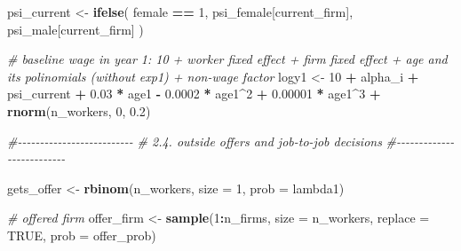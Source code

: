 \documentclass[
]{article}
\newenvironment{Shaded}{\begin{snugshade}}{\end{snugshade}}
\newcommand{\AttributeTok}[1]{\textcolor[rgb]{0.13,0.29,0.53}{#1}}
\newcommand{\CommentTok}[1]{\textcolor[rgb]{0.56,0.35,0.01}{\textit{#1}}}
\newcommand{\ConstantTok}[1]{\textcolor[rgb]{0.56,0.35,0.01}{#1}}
\newcommand{\DecValTok}[1]{\textcolor[rgb]{0.00,0.00,0.81}{#1}}
\newcommand{\FloatTok}[1]{\textcolor[rgb]{0.00,0.00,0.81}{#1}}
\newcommand{\FunctionTok}[1]{\textcolor[rgb]{0.13,0.29,0.53}{\textbf{#1}}}
\newcommand{\NormalTok}[1]{#1}
\newcommand{\OtherTok}[1]{\textcolor[rgb]{0.56,0.35,0.01}{#1}}
\newcommand{\SpecialCharTok}[1]{\textcolor[rgb]{0.81,0.36,0.00}{\textbf{#1}}}
\begin{document}
\begin{Shaded}
\begin{Highlighting}[]
\NormalTok{        psi\_current }\OtherTok{\textless{}{-}} \FunctionTok{ifelse}\NormalTok{(}
\NormalTok{            female }\SpecialCharTok{==} \DecValTok{1}\NormalTok{,}
\NormalTok{            psi\_female[current\_firm],}
\NormalTok{            psi\_male[current\_firm]}
\NormalTok{        )}

        \CommentTok{\# baseline wage in year 1: 10 + worker fixed effect + firm fixed effect + age and its polinomials (without exp1) + non{-}wage factor}
\NormalTok{        logy1 }\OtherTok{\textless{}{-}} \DecValTok{10} \SpecialCharTok{+}\NormalTok{ alpha\_i }\SpecialCharTok{+}\NormalTok{ psi\_current }\SpecialCharTok{+}
            \FloatTok{0.03} \SpecialCharTok{*}\NormalTok{ age1 }\SpecialCharTok{{-}} \FloatTok{0.0002} \SpecialCharTok{*}\NormalTok{ age1}\SpecialCharTok{\^{}}\DecValTok{2} \SpecialCharTok{+} \FloatTok{0.00001} \SpecialCharTok{*}\NormalTok{ age1}\SpecialCharTok{\^{}}\DecValTok{3} \SpecialCharTok{+}
            \FunctionTok{rnorm}\NormalTok{(n\_workers, }\DecValTok{0}\NormalTok{, }\FloatTok{0.2}\NormalTok{)}

        \CommentTok{\#{-}{-}{-}{-}{-}{-}{-}{-}{-}{-}{-}{-}{-}{-}{-}{-}{-}{-}{-}{-}{-}{-}{-}{-}{-}{-}}
        \CommentTok{\# 2.4. outside offers and job{-}to{-}job decisions}
        \CommentTok{\#{-}{-}{-}{-}{-}{-}{-}{-}{-}{-}{-}{-}{-}{-}{-}{-}{-}{-}{-}{-}{-}{-}{-}{-}{-}{-}}

\NormalTok{        gets\_offer }\OtherTok{\textless{}{-}} \FunctionTok{rbinom}\NormalTok{(n\_workers, }\AttributeTok{size =} \DecValTok{1}\NormalTok{, }\AttributeTok{prob =}\NormalTok{ lambda1)}

        \CommentTok{\# offered firm}
\NormalTok{        offer\_firm }\OtherTok{\textless{}{-}} \FunctionTok{sample}\NormalTok{(}\DecValTok{1}\SpecialCharTok{:}\NormalTok{n\_firms, }\AttributeTok{size =}\NormalTok{ n\_workers, }\AttributeTok{replace =} \ConstantTok{TRUE}\NormalTok{, }\AttributeTok{prob =}\NormalTok{ offer\_prob)}


\end{Highlighting}
\end{Shaded}
\end{document}
